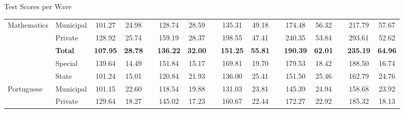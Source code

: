 \documentclass{beamer}
\begin{document}
\begin{frame}[label=ScoresWave]{Test Scores per Wave}
\begin{table}[H]
\begin{adjustbox}{width=1\textwidth}
\begin{tabular}{llllllllllllllll}
    Mathematics & Municipal & \multicolumn{1}{c}{101.27} & \multicolumn{1}{c}{24.98} &       & \multicolumn{1}{c}{128.74} & \multicolumn{1}{c}{28.59} &       & \multicolumn{1}{c}{135.31} & \multicolumn{1}{c}{49.18} &       & \multicolumn{1}{c}{174.48} & \multicolumn{1}{c}{56.32} &       & \multicolumn{1}{c}{217.79} & \multicolumn{1}{c}{57.67} \\
          & Private & \multicolumn{1}{c}{128.92} & \multicolumn{1}{c}{25.74} &       & \multicolumn{1}{c}{159.19} & \multicolumn{1}{c}{28.37} &       & \multicolumn{1}{c}{198.55} & \multicolumn{1}{c}{47.41} &       & \multicolumn{1}{c}{240.35} & \multicolumn{1}{c}{53.84} &       & \multicolumn{1}{c}{293.61} & \multicolumn{1}{c}{52.62} \\
\cmidrule{2-16}          & \textbf{Total} & \multicolumn{1}{c}{\textbf{107.95}} & \multicolumn{1}{c}{\textbf{28.78}} &       & \multicolumn{1}{c}{\textbf{136.22}} & \multicolumn{1}{c}{\textbf{32.00}} &       & \multicolumn{1}{c}{\textbf{151.25}} & \multicolumn{1}{c}{\textbf{55.81}} &       & \multicolumn{1}{c}{\textbf{190.39}} & \multicolumn{1}{c}{\textbf{62.01}} &       & \multicolumn{1}{c}{\textbf{235.19}} & \multicolumn{1}{c}{\textbf{64.96}} \\
    \midrule
          & Special & \multicolumn{1}{c}{139.64} & \multicolumn{1}{c}{14.49} &       & \multicolumn{1}{c}{151.84} & \multicolumn{1}{c}{15.17} &       & \multicolumn{1}{c}{169.81} & \multicolumn{1}{c}{19.70} &       & \multicolumn{1}{c}{179.53} & \multicolumn{1}{c}{18.42} &       & \multicolumn{1}{c}{188.50} & \multicolumn{1}{c}{16.74} \\
          & State & \multicolumn{1}{c}{101.24} & \multicolumn{1}{c}{15.01} &       & \multicolumn{1}{c}{120.84} & \multicolumn{1}{c}{21.93} &       & \multicolumn{1}{c}{136.00} & \multicolumn{1}{c}{25.41} &       & \multicolumn{1}{c}{151.50} & \multicolumn{1}{c}{25.46} &       & \multicolumn{1}{c}{162.79} & \multicolumn{1}{c}{24.76} \\
    Portuguese & Municipal & \multicolumn{1}{c}{101.15} & \multicolumn{1}{c}{22.60} &       & \multicolumn{1}{c}{118.54} & \multicolumn{1}{c}{19.88} &       & \multicolumn{1}{c}{131.03} & \multicolumn{1}{c}{23.81} &       & \multicolumn{1}{c}{145.39} & \multicolumn{1}{c}{24.94} &       & \multicolumn{1}{c}{158.68} & \multicolumn{1}{c}{23.92} \\
          & Private & \multicolumn{1}{c}{129.64} & \multicolumn{1}{c}{18.27} &       & \multicolumn{1}{c}{145.02} & \multicolumn{1}{c}{17.23} &       & \multicolumn{1}{c}{160.67} & \multicolumn{1}{c}{22.44} &       & \multicolumn{1}{c}{172.27} & \multicolumn{1}{c}{22.92} &       & \multicolumn{1}{c}{185.32} & \multicolumn{1}{c}{18.13} \\

\end{tabular}
\end{adjustbox}
\end{table}
\end{frame}
\end{document}
